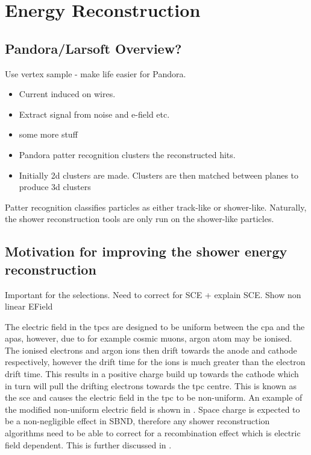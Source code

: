 \chapter{Energy Reconstruction}
\label{chap:Energy Reco}

\section{Pandora/Larsoft Overview?}

Use vertex sample - make life easier for Pandora.

\begin{itemize}
    \item Current induced on wires.
    \item Extract signal from noise and e-field etc.
    \item some more stuff
    \item Pandora patter recognition clusters the reconstructed hits.
    \item Initially 2d clusters are made. Clusters are then matched between planes to produce 3d clusters
\end{itemize}

Patter recognition classifies particles as either track-like or shower-like. Naturally, the shower reconstruction tools are only run on the shower-like particles.




\section{Motivation for improving the shower energy reconstruction}
Important for the selections. 
Need to correct for SCE + explain SCE. Show non linear EField

The electric field in the \Glspl{tpc} are designed to be uniform between the \Gls{cpa} and the \Glspl{apa}, however, due to for example cosmic muons, argon atom may be ionised. The ionised electrons and argon ions then drift towards the anode and cathode respectively, however the drift time for the ions is much greater than the electron drift time. This results in a positive charge build up towards the cathode which in turn will pull the drifting electrons towards the \Gls{tpc} centre. This is known as the \Gls{sce} and causes the electric field in the \Gls{tpc} to be non-uniform. An example of the modified non-uniform electric field is shown in . Space charge is expected to be a non-negligible effect in SBND, therefore any shower reconstruction algorithms need to be able to correct for a recombination effect which is electric field dependent. This is further discussed in .

